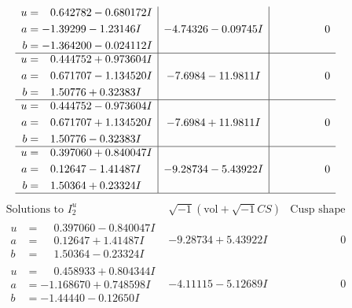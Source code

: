 \documentclass[1p]{elsarticle_modified}
\theoremstyle{definition}
\newcommand{\I}{\sqrt{-1}}
\begin{document}
$$\begin{array}{c|c|c}
\begin{aligned}
u &= \phantom{-}0.642782 - 0.680172 I \\
a &= -1.39299 - 1.23146 I \\
b &= -1.364200 - 0.024112 I\end{aligned}
 & -4.74326 - 0.09745 I & \phantom{-0.000000 } 0 \\ \hline\begin{aligned}
u &= \phantom{-}0.444752 + 0.973604 I \\
a &= \phantom{-}0.671707 - 1.134520 I \\
b &= \phantom{-}1.50776 + 0.32383 I\end{aligned}
 & -7.6984 - 11.9811 I & \phantom{-0.000000 } 0 \\ \hline\begin{aligned}
u &= \phantom{-}0.444752 - 0.973604 I \\
a &= \phantom{-}0.671707 + 1.134520 I \\
b &= \phantom{-}1.50776 - 0.32383 I\end{aligned}
 & -7.6984 + 11.9811 I & \phantom{-0.000000 } 0 \\ \hline\begin{aligned}
u &= \phantom{-}0.397060 + 0.840047 I \\
a &= \phantom{-}0.12647 - 1.41487 I \\
b &= \phantom{-}1.50364 + 0.23324 I\end{aligned}
 & -9.28734 - 5.43922 I & \phantom{-0.000000 } 0\\
 \hline 
 \end{array}$$\newpage$$\begin{array}{c|c|c}  
\text{Solutions to }I^u_{2}& \I (\text{vol} + \sqrt{-1}CS) & \text{Cusp shape}\\
 \hline 
\begin{aligned}
u &= \phantom{-}0.397060 - 0.840047 I \\
a &= \phantom{-}0.12647 + 1.41487 I \\
b &= \phantom{-}1.50364 - 0.23324 I\end{aligned}
 & -9.28734 + 5.43922 I & \phantom{-0.000000 } 0 \\ \hline\begin{aligned}
u &= \phantom{-}0.458933 + 0.804344 I \\
a &= -1.168670 + 0.748598 I \\
b &= -1.44440 - 0.12650 I\end{aligned}
 & -4.11115 - 5.12689 I & \phantom{-0.000000 } 0 \\ \hline\begin{aligned}

\end{aligned}
\end{array}$$
\end{document}
